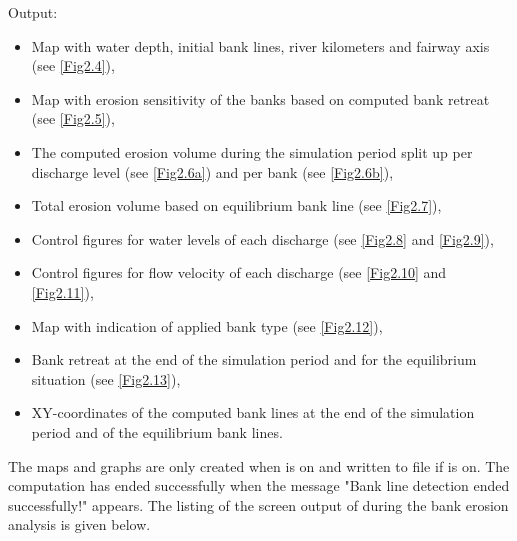Output:

\begin{itemize}
	\item Map with water depth, initial bank lines, river kilometers and fairway axis (see \autoref{Fig2.4}),
	\item Map with erosion sensitivity of the banks based on computed bank retreat (see \autoref{Fig2.5}),
	\item The computed erosion volume during the simulation period split up per discharge level (see \autoref{Fig2.6a}) and per bank (see \autoref{Fig2.6b}),
	\item Total erosion volume based on equilibrium bank line (see \autoref{Fig2.7}),
	\item Control figures for water levels of each discharge (see \autoref{Fig2.8} and \autoref{Fig2.9}),
	\item Control figures for flow velocity of each discharge (see \autoref{Fig2.10} and \autoref{Fig2.11}),
	\item Map with indication of applied bank type (see \autoref{Fig2.12}),
	\item Bank retreat at the end of the simulation period and for the equilibrium situation (see \autoref{Fig2.13}),
	\item XY-coordinates of the computed bank lines at the end of the simulation period and of the equilibrium bank lines.
\end{itemize}

The maps and graphs are only created when  is on and written to file if  is on.
The computation has ended successfully when the message "Bank line detection ended successfully!" appears.
The listing of the screen output of \dfastbe during the bank erosion analysis is given below.

